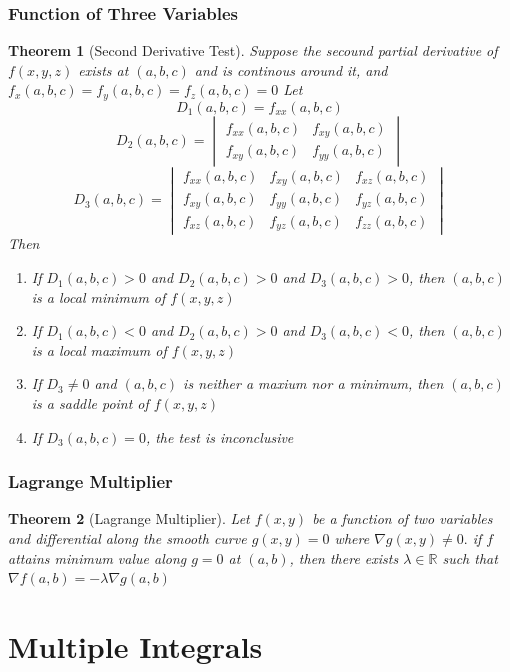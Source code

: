 \documentclass[9pt]{article}
\newtheorem{theorem}{Theorem}[subsection]
\theoremstyle{definition}
\theoremstyle{remark}
\begin{document}
\subsubsection{Function of Three Variables}
\begin{theorem}[Second Derivative Test]
Suppose the secound partial derivative of $f(x,y,z)$ exists at $(a,b,c)$ and is continous around it, and $f_x(a,b,c)=f_y(a,b,c)=f_z(a,b,c) = 0$
Let 
\[
	D_1(a, b, c) = f_{xx}(a,b,c)
\]
\[
	D_2(a, b, c) = \begin{vmatrix} f_{xx}(a,b,c) & f_{xy}(a,b,c) \\ f_{xy}(a,b,c) & f_{yy}(a,b,c) \end{vmatrix}
\]
\[
	D_3(a, b, c) = \begin{vmatrix} f_{xx}(a,b,c) & f_{xy}(a,b,c) & f_{xz}(a,b,c) \\ f_{xy}(a,b,c) & f_{yy}(a,b,c) & f_{yz}(a,b,c) \\ f_{xz}(a,b,c) & f_{yz}(a,b,c) & f_{zz}(a,b,c) \end{vmatrix}
\]
Then 
\begin{enumerate}
	\item If $D_1(a,b,c) > 0$ and $D_2(a,b,c) > 0$ and $D_3(a,b,c) > 0$, then $(a,b,c)$ is a local minimum of $f(x,y,z)$
	\item If $D_1(a,b,c) < 0$ and $D_2(a,b,c) > 0$ and $D_3(a,b,c) < 0$, then $(a,b,c)$ is a local maximum of $f(x,y,z)$
	\item If $D_3 \neq 0$ and $(a,b,c)$ is neither a maxium nor a minimum, then $(a,b,c)$ is a saddle point of $f(x,y,z)$
	\item If $D_3(a,b,c) = 0$, the test is inconclusive

\end{enumerate}
\end{theorem}
\subsubsection{Lagrange Multiplier}

\begin{theorem}[Lagrange Multiplier]
	Let $f(x,y)$ be a function of two variables and differential along the smooth curve $g(x,y) = 0$ where $\nabla g (x,y) \neq 0.$ 
	if $f$ attains minimum value along $g = 0$ at $(a,b)$, then there exists $\lambda \in \mathbb{R}$ such that
	$
		\nabla f (a,b)= - \lambda \nabla g(a, b)
	$
\end{theorem}
\section{Multiple Integrals}
\end{document}
